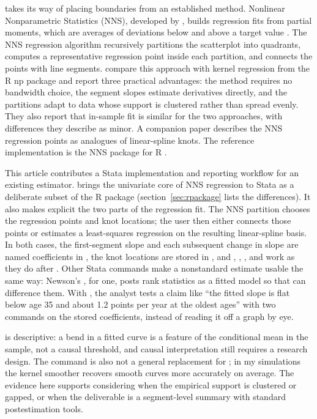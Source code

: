\documentclass[bib]{statapress}
\begin{document}
 takes its way of placing boundaries from an established
method.  Nonlinear Nonparametric Statistics (NNS), developed by
\citet{viole_nawrocki_2013}, builds regression fits from partial moments,
which are averages of deviations below and above a target value
\citep{viole_nawrocki_2012_cdf,viole_nawrocki_2012_corr,nawrocki_viole_2024}.
The NNS regression
algorithm recursively partitions the scatterplot into quadrants, computes a
representative regression point inside each partition, and connects the
points with line segments.  \citet{vinod_viole_2018_clusters} compare this
approach with kernel regression from the R np package
\citep{hayfield_racine_2008} and report three practical advantages: the
method requires no bandwidth choice, the segment slopes estimate derivatives
directly, and the partitions adapt to data whose support is clustered rather
than spread evenly.  They also report that in-sample fit is similar for the
two approaches, with differences they describe as minor.  A companion paper
\citep{vinod_viole_2018_segments} describes the NNS regression points as
analogues of linear-spline knots.  The reference implementation is the NNS
package for R \citep{viole_2026_nns}.

This article contributes a Stata implementation and reporting workflow for an
existing estimator.
 brings the univariate core of NNS regression to Stata as a
deliberate subset of the R package (section~\ref{sec:rpackage} lists the
differences).  It also makes explicit the two parts of the regression fit.
The NNS partition chooses the regression points and knot locations; the user
then either connects those points or estimates a least-squares regression on
the resulting linear-spline basis.  In both cases, the first-segment slope and
each subsequent change in slope are named coefficients in , the
knot locations are stored in , and ,
, , and 
\citep{jann_2014} work as they do after .  Other Stata commands
make a nonstandard estimate usable the same way: Newson's 
\citep{newson_2006}, for one, posts rank statistics as a fitted model so that
 can difference them.  With , the analyst tests a
claim like ``the fitted slope is flat below age 35 and about 1.2 points per
year at the oldest ages'' with two  commands on the stored
coefficients, instead of reading it off a graph by eye.

 is descriptive: a bend in a fitted curve is a feature of the
conditional mean in the sample, not a causal threshold, and causal
interpretation still requires a research design.  The command is also not a
general replacement for ; in my simulations the
kernel smoother recovers smooth curves more accurately on average.  The
evidence here supports considering  when the empirical support
is clustered or gapped, or when the deliverable is a segment-level summary
with standard postestimation tools.
\end{document}
